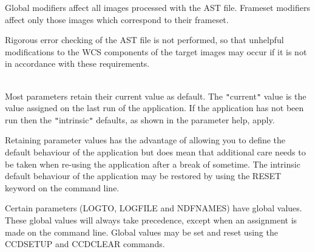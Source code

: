 \documentclass[twoside,11pt]{article}
\newcommand{\htmlref}[2]{#1}
\renewcommand{\_}{\texttt{\symbol{95}}}
\newcommand{\qt}[1]{{\tt "}#1{\tt "}}
\newcommand{\xroutine}[1]{\htmlref{{\sc #1}}{#1}}
\newcommand{\sstdiytopic}[2]{\item[#1:] \mbox{} \\[1.3ex] #2}
\newcommand{\sstdiytopic}[2]{\item[{#1}] #2 }
\begin{document}
{{            Global modifiers affect all images processed with the AST
            file.  Frameset modifiers affect only those images which
            correspond to their frameset.

         Rigorous error checking of the AST file is not performed, so
         that unhelpful modifications to the WCS components of the
         target images may occur if it is not in accordance with these
         requirements.
   }
   \sstdiytopic{
      Behaviour of parameters
   } {
      Most parameters retain their current value as default. The
      \qt{current} value is the value assigned on the last run of the
      application. If the application has not been run then the
      \qt{intrinsic} defaults, as shown in the parameter help, apply.

      Retaining parameter values has the advantage of allowing you to
      define the default behaviour of the application but does mean
      that additional care needs to be taken when re-using the
      application after a break of sometime. The intrinsic default
      behaviour of the application may be restored by using the RESET
      keyword on the command line.

      Certain parameters (LOGTO, LOGFILE and NDFNAMES) have global
      values. These global values will always take precedence, except
      when an assignment is made on the command line.  Global values may
      be set and reset using the \xroutine{CCDSETUP} and 
      \xroutine{CCDCLEAR} commands.
   }
}
\end{document}
